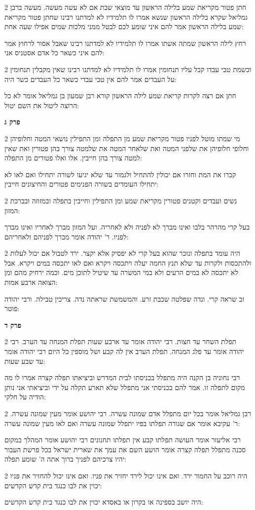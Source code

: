 \documentclass[12pt, openany]{book}
\newcommand{\sethebfont}{
\fontsize{10.5pt}{21.0pt} \selectfont
}
\newcommand{\twocol}[1]{
	{\sethebfont \begin{multicols}{2}
			#1
	\end{multicols}}	
}
\newcommand{\sectname}{}
\newcommand{\newsection}[1]{
	\addcontentsline{toc}{section}{#1}
	\renewcommand{\sectname}{#1}	
	\vspace{-\baselineskip}
	\begin{center}
		\textbf{%
\fontsize{16pt}{16pt}\selectfont
			#1}
	\end{center}
	\vspace{-\baselineskip}
	\nopagebreak
}
\begin{document}
\twocol{חתן פטור מקריאת שמע בלילה הראשון עד מוצאי שבת אם לא עשה מעשה. מעשה ברבן גמליאל שקרא בלילה הראשון שנשא אמרו לו תלמידיו לא למדתנו רבינו שחתן פטור מקריאת שמע בלילה הראשון אמר להם איני שומע לכם לבטל ממני מלכות שמים אפילו שעה אחת: 
\par רחץ לילה הראשון שמתה אשתו אמרו לו תלמידיו לא למדתנו רבינו שאבל אסור לרחוץ אמר להם איני כשאר כל אדם אסטניס אני: }
\twocol{וכשמת טבי עבדו קבל עליו תנחומין אמרו לו תלמידיו לא למדתנו רבינו שאין מקבלין תנחומין על העבדים אמר להם אין טבי עבדי כשאר כל העבדים כשר היה: 
\par חתן אם רצה לקרות קריאת שמע לילה הראשון קורא רבן שמעון בן גמליאל אומר לא כל הרוצה ליטול את השם יטול: }
\newsection{פרק ג}
\twocol{מי שמתו מוטל לפניו פטור מקריאת שמע מן התפלה ומן התפילין נושאי המטה וחלופיהן וחלופי חלופיהן את שלפני המטה ואת שלאחר המטה את שלמטה צורך בהן פטורין ואת שאין למטה צורך בהן חייבין. אלו ואלו פטורים מן התפלה: 
\par קברו את המת וחזרו אם יכולין להתחיל ולגמור עד שלא יגיעו לשורה יתחילו ואם לאו לא יתחילו העומדים בשורה הפנימים פטורים והחיצונים חייבין: }
\twocol{נשים ועבדים וקטנים פטורין מקריאת שמע ומן התפילין וחייבין בתפלה ובמזוזה ובברכת המזון: 
\par בעל קרי מהרהר בלבו ואינו מברך לא לפניה ולא לאחריה. ועל המזון מברך לאחריו ואינו מברך לפניו. ר' יהודה אומר מברך לפניהם ולאחריהם: }
\twocol{היה עומד בתפלה ונזכר שהוא בעל קרי לא יפסיק אלא יקצר. ירד לטבול אם יכול לעלות ולהתכסות ולקרות עד שלא תנץ החמה יעלה ויתכסה ויקרא ואם לאו יתכסה במים ויקרא. אבל לא יתכסה לא במים הרעים ולא במי המשרה עד שיטיל לתוכן מים. וכמה ירחיק מהם ומן הצואה ארבע אמות: 
\par זב שראה קרי. ונדה שפלטה שכבת זרע. והמשמשת שראתה נדה. צריכין טבילה. ורבי יהודה פוטר: }
\newsection{פרק ד}
\twocol{תפלת השחר עד חצות. רבי יהודה אומר עד ארבע שעות תפלת המנחה עד הערב. רבי יהודה אומר עד פלג המנחה. תפלת הערב אין לה קבע ושל מוספין כל היום רבי יהודה אומר עד שבע שעות: 
\par רבי נחוניה בן הקנה היה מתפלל בכניסתו לבית המדרש וביציאתו תפלה קצרה אמרו לו מה מקום לתפלה זו. אמר להם בכניסתי אני מתפלל שלא תארע תקלה על ידי וביציאתי אני נותן הודיה על חלקי: }
\twocol{רבן גמליאל אומר בכל יום מתפלל אדם שמונה עשרה. רבי יהושע אומר מעין שמונה עשרה. ר' עקיבא אומר אם שגורה תפלתו בפיו יתפלל שמונה עשרה ואם לאו מעין שמונה עשרה: 
\par רבי אליעזר אומר העושה תפלתו קבע אין תפלתו תחנונים רבי יהושע אומר המהלך במקום סכנה מתפלל תפלה קצרה אומר הושע השם את עמך את שארית ישראל בכל פרשת העבור יהיו צרכיהם לפניך ברוך אתה ה' שומע תפלה: }
\twocol{היה רוכב על החמור ירד. ואם אינו יכול לירד יחזיר את פניו. ואם אינו יכול להחזיר את פניו יכוין את לבו כנגד בית קדש הקדשים: 
\par היה יושב בספינה או בקרון או באסדא יכוין את לבו כנגד בית קדש הקדשים: }
\end{document}
